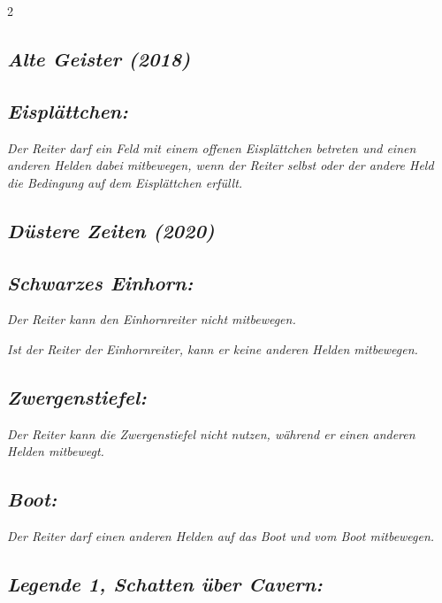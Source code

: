 \documentclass[10pt, a4paper, oneside]{book}
\newcommand{\fan}[1]{\textit{#1}}
\begin{document}
\begin{multicols*}{2}
\begin{bgcolor}[color-ag]
\section{\fan{Alte Geister (2018)}}


\subsection{\fan{Eisplättchen:}}

\fan{Der Reiter darf ein Feld mit einem offenen Eisplättchen betreten und einen anderen Helden dabei mitbewegen, wenn der Reiter selbst oder der andere Held die Bedingung auf dem Eisplättchen erfüllt.}


\end{bgcolor}




\columnbreak




\begin{bgcolor}[color-dz]
\section{\fan{Düstere Zeiten (2020)}}

\subsection{\fan{Schwarzes Einhorn:}}

\fan{Der Reiter kann den Einhornreiter nicht mitbewegen.} 

\fan{Ist der Reiter der Einhornreiter, kann er keine anderen Helden mitbewegen.}



\subsection{\fan{Zwergenstiefel:}}

\fan{Der Reiter kann die Zwergenstiefel nicht nutzen, während er einen anderen Helden mitbewegt.}


\subsection{\fan{Boot:}}

\fan{Der Reiter darf einen anderen Helden auf das Boot und vom Boot mitbewegen.}



\subsection{\fan{Legende 1, Schatten über Cavern:}}


\end{bgcolor}
\end{multicols*}
\end{document}
